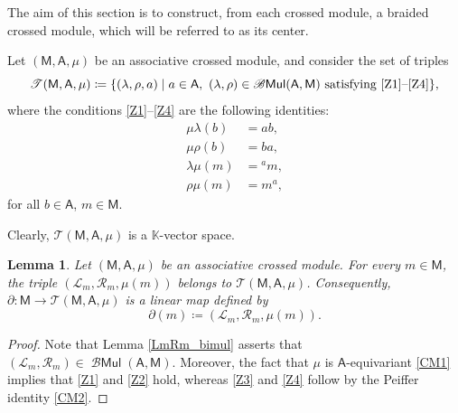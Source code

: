 \documentclass[12pt,reqno]{amsart}
\theoremstyle{plain}
\newtheorem{lemma}[theorem]{Lemma}
\theoremstyle{definition}
\theoremstyle{remark}
\def\lam{\lambda}
\newcommand{\K}{\ensuremath{\mathbb{K}}}
\newcommand{\A}{\ensuremath{\mathsf{A}}}
\newcommand{\MM}{\ensuremath{\mathsf{M}}}
\newcommand{\T}{\ensuremath{\mathcal{T}}}
\newcommand{\LL}{\ensuremath{\mathcal{L}}}
\newcommand{\RR}{\ensuremath{\mathcal{R}}}
\DeclareMathOperator{\Mul}{\mathcal{B}\ensuremath{\mathsf{Mul}}}
\numberwithin{equation}{section}
\begin{document}
The aim of this section is to construct, from each crossed module, a braided crossed module, which will be referred to as its center.

Let $(\MM,\A,\mu)$ be an  associative crossed module, and consider the set of triples
\[
\T(\MM,\A,\mu) \coloneqq
\{(\lam, \rho,a) \mid a\in \A,\ (\lam, \rho)\in\Mul(\A,\MM) \ \text{satisfying \eqref{Z1}--\eqref{Z4}}\},
\]
where the conditions \eqref{Z1}--\eqref{Z4} are the following identities:
\begin{align}
	\mu\lam(b) & = ab,  \label{Z1} \tag{Z1}\\
	\mu\rho(b) & = ba, \label{Z2} \tag{Z2}\\
	\lam\mu(m) & = {}^a  m,  \label{Z3} \tag{Z3}\\
	\rho\mu(m) & = m^a , \label{Z4} \tag{Z4}
\end{align}
for all $b\in \A$, $m\in \MM$.	

Clearly,  $\T(\MM,\A,\mu)$ is a $\K$-vector space.
\begin{lemma}\label{partial_linear}
	Let $(\MM,\A,\mu)$	be an  associative crossed module. For every $m \in \MM$, the triple $(\LL_m,\RR_m,\mu(m))$ belongs to $\T(\MM,\A,\mu)$.
	 Consequently, $ \partial \colon \MM \longrightarrow  \T(\MM,\A,\mu)$  is a linear map defined by 
		\begin{equation}\label{def_partial}
			\partial (m) \coloneqq (  \LL_m,\RR_m, \mu(m)).
		\end{equation}		
\end{lemma}

\begin{proof} Note that Lemma \ref{LmRm_bimul} asserts that $(\LL_m, \RR_m)\in\Mul(\A,\MM)$. Moreover, the fact that $\mu$ is $\A$-equivariant \eqref{CM1} implies that \eqref{Z1} and \eqref{Z2} hold, whereas \eqref{Z3} and \eqref{Z4} follow by the Peiffer identity \eqref{CM2}.
	\end{proof}
	
\end{document}
